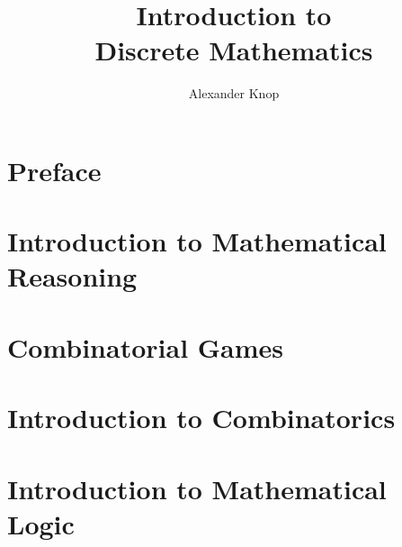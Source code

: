 

\title{ Introduction to \\Discrete Mathematics}
\author{Alexander Knop}


  \maketitle

  \frontmatter

  \tableofcontents

  \clearpage
  \markboth{\nomname}{\nomname}
  \printnomenclature

  \part*{Preface}
  

  \mainmatter

  \part{Introduction to Mathematical Reasoning}
  \label{part:mathematical-reasoning}
  
  
  
  
  
  
  
  \part{Combinatorial Games}
  \label{part:combinatorial-games}
  
  
  \part{Introduction to Combinatorics}
  \label{part:combinatorics}
  
  
  
  
  
  
  
  \part{Introduction to Mathematical Logic}
  \label{part:logic}
  
  
